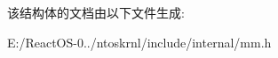 \begin{DoxyCompactItemize}
\begin{tabbing}
\end{tabbing}\end{DoxyCompactItemize}


该结构体的文档由以下文件生成\+:\begin{DoxyCompactItemize}
\item 
E\+:/\+React\+O\+S-\/0../ntoskrnl/include/internal/mm.\+h\end{DoxyCompactItemize}
